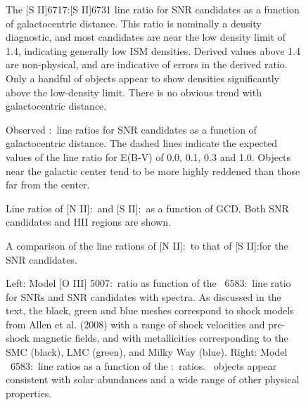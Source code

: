 \begin{figure}
\caption{The [S II]6717:[S II]6731 line ratio for SNR candidates as a function of galactocentric distance.  This ratio is nominally a density diagnostic, and most candidates are near the low density limit of 1.4, indicating generally low ISM densities. Derived values above 1.4 are non-physical, and are indicative of errors in the derived ratio.  Only a handful of objects appear to show densities significantly above the low-density limit.  There is no obvious trend with galactocentric distance.  \label{fig_s2_ratio}}
\end{figure}

\begin{figure}
\caption{Observed \hb:\ha\ line ratios for SNR candidates as a function of galactocentric distance. The dashed lines indicate the expected values of the line ratio for E(B-V) of 0.0, 0.1, 0.3 and 1.0.  Objects near the galactic center tend to be more highly reddened than those far from the center. \label{fig_reddening}}
\end{figure}

\begin{figure}
\caption{Line ratios of [N II]:\ha\ and [S II]:\ha\ as a function of GCD.  Both SNR candidates and HII regions are shown.     \label{fig_metal_ratios}}

\end{figure}

\begin{figure}
\caption{A comparison of the line rations of [N II]:\ha\ to that of [S II]:\ha for the SNR candidates. \label{fig_s2_n2}}
\end{figure}


\begin{figure}
\caption{Left: Model [O III] 5007:\hb\ ratio as function of the \nii\ 6583:\ha\ line ratio for SNRs and SNR candidates with spectra. As discussed in the text, the black, green and blue meshes correspond to shock models from Allen et al. (2008) with a range of shock velocities and pre-shock magnetic fields, and with metallicities corresponding to the SMC (black), LMC (green), and Milky Way (blue).  Right: Model \nii\ 6583:\ha\ line ratios as a function of the \sii:\ha\ ratios.  \gal\ objects appear consistent with solar abundances and a wide range of other physical properties.  \label{fig_model}}
\end{figure}

